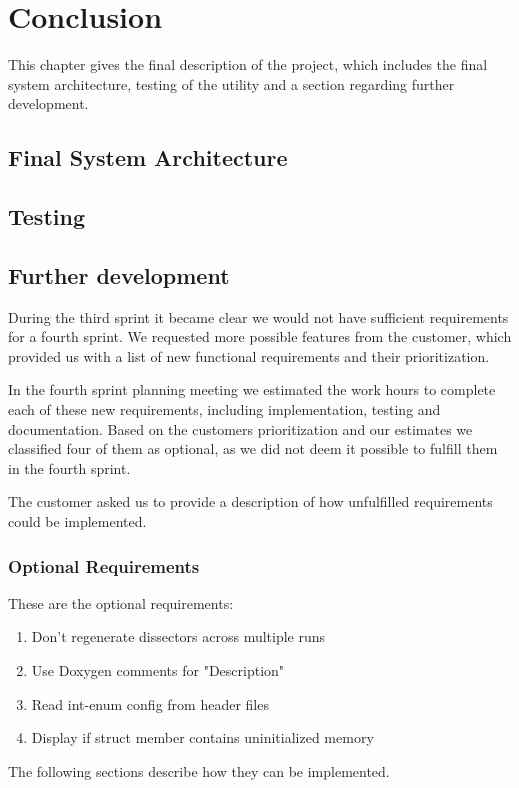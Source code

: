 \chapter{Conclusion}
This chapter gives the final description of the project, which includes the final system architecture, testing of the utility and a section regarding further development. 

\section{Final System Architecture}

\section{Testing}

\section{Further development}
\label{sec:eval:furtherdev}
During the third sprint it became clear we would not have sufficient requirements for a fourth sprint. We requested more possible features from the customer, which provided us with a list of new functional requirements and their prioritization.

In the fourth sprint planning meeting we estimated the work hours to complete each of these new requirements, including implementation, testing and documentation. Based on the customers prioritization and our estimates we classified four of them as optional, as we did not deem it possible to fulfill them in the fourth sprint. 

The customer asked us to provide a description of how unfulfilled requirements could be implemented.

\subsection{Optional Requirements}
These are the optional requirements:
\begin{enumerate}
\item Don't regenerate dissectors across multiple runs
\item Use Doxygen comments for "Description"	
\item Read int-enum config from header files
\item Display if struct member contains uninitialized memory
\end {enumerate}
The following sections describe how they can be implemented.

